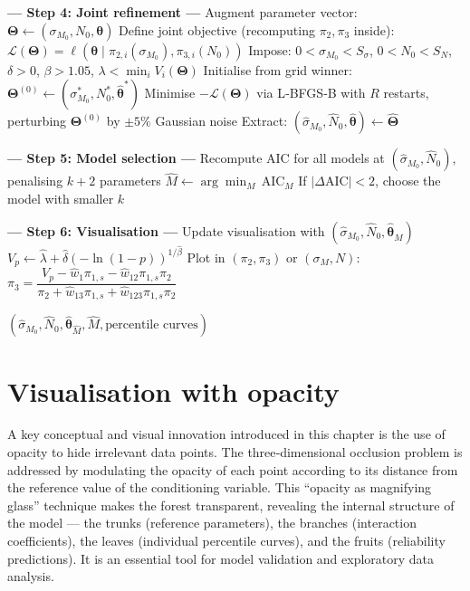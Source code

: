 \begin{algorithm}[htbp]
\begin{algorithmic}[1]
\Statex \textbf{--- Step 4: Joint refinement ---}
\State Augment parameter vector: $\boldsymbol{\Theta}\leftarrow(\sigma_{M_0},N_0,\boldsymbol{\theta})$
\State Define joint objective (recomputing $\pi_2,\pi_3$ inside):
\Statex\hspace{2em} $\mathcal{L}(\boldsymbol{\Theta})= \ell\!\left(\boldsymbol{\theta}\;\big|\; \pi_{2,i}(\sigma_{M_0}),\pi_{3,i}(N_0)\right)$
\State Impose: $0<\sigma_{M_0}<S_\sigma$, $0<N_0<S_N$, $\delta>0$, $\beta>1.05$, $\lambda<\min_i V_i(\boldsymbol{\Theta})$
\State Initialise from grid winner: $\boldsymbol{\Theta}^{(0)}\leftarrow(\sigma_{M_0}^*,N_0^*,\hat{\boldsymbol{\theta}}^*)$
\State Minimise $-\mathcal{L}(\boldsymbol{\Theta})$ via L‑BFGS‑B with $R$ restarts, perturbing $\boldsymbol{\Theta}^{(0)}$ by $\pm5\%$ Gaussian noise
\State Extract: $(\hat{\sigma}_{M_0},\hat{N}_0,\hat{\boldsymbol{\theta}})\leftarrow\hat{\boldsymbol{\Theta}}$

\Statex \textbf{--- Step 5: Model selection ---}
\State Recompute AIC for all models at $(\hat{\sigma}_{M_0},\hat{N}_0)$, penalising $k+2$ parameters
\State $\hat{M}\leftarrow\arg\min_M\,\mathrm{AIC}_M$
\State If $|\Delta\mathrm{AIC}|<2$, choose the model with smaller $k$

\Statex \textbf{--- Step 6: Visualisation ---}
\State Update visualisation with $(\hat{\sigma}_{M_0},\hat{N}_0,\hat{\boldsymbol{\theta}}_{\hat{M}})$
    \State $V_p\leftarrow \hat{\lambda} + \hat{\delta}(-\ln(1-p))^{1/\hat{\beta}}$
    \State Plot in $(\pi_2,\pi_3)$ or $(\sigma_M,N)$:
    \Statex\hspace{2em} $\pi_3 = \dfrac{V_p - \hat{w}_1\pi_{1,s} - \hat{w}_{12}\pi_{1,s}\pi_2}{\pi_2 + \hat{w}_{13}\pi_{1,s} + \hat{w}_{123}\pi_{1,s}\pi_2}$
  \EndFor
\EndFor

\State \Return $(\hat{\sigma}_{M_0},\hat{N}_0,\hat{\boldsymbol{\theta}}_{\hat{M}},\hat{M},\text{percentile curves})$
\end{algorithmic}
\end{algorithm}

\section{Visualisation with opacity}
\label{sec:opacity-visualization}

A key conceptual and visual innovation introduced in this chapter is the use of opacity to hide irrelevant data points. The three‑dimensional occlusion problem is addressed by modulating the opacity of each point according to its distance from the reference value of the conditioning variable. This “opacity as magnifying glass” technique makes the forest transparent, revealing the internal structure of the model — the trunks (reference parameters), the branches (interaction coefficients), the leaves (individual percentile curves), and the fruits (reliability predictions). It is an essential tool for model validation and exploratory data analysis.

